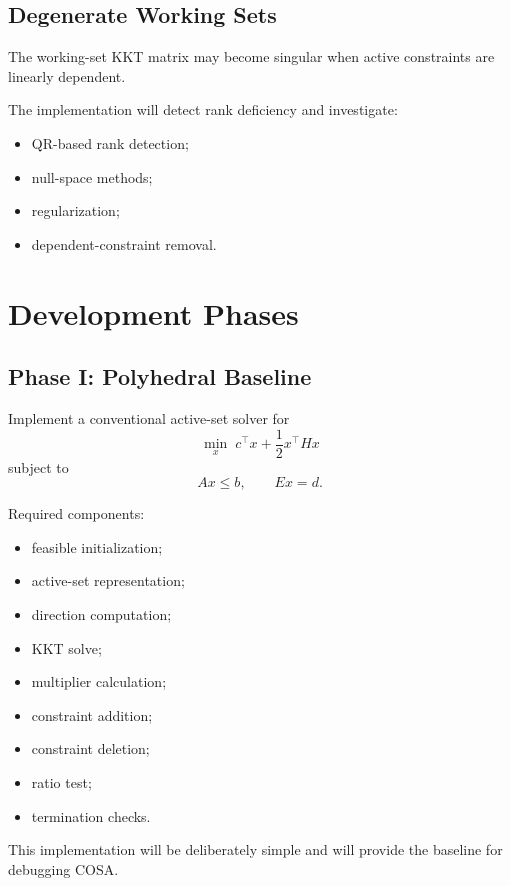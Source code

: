 \documentclass[11pt,a4paper]{article}
\begin{document}
\subsection{Degenerate Working Sets}

The working-set KKT matrix may become singular when active constraints
are linearly dependent.

The implementation will detect rank deficiency and investigate:

\begin{itemize}
    \item QR-based rank detection;
    \item null-space methods;
    \item regularization;
    \item dependent-constraint removal.
\end{itemize}

\section{Development Phases}

\subsection{Phase I: Polyhedral Baseline}

Implement a conventional active-set solver for
\[
\min_x\;
c^\top x+\frac12x^\top Hx
\]
subject to
\[
Ax\leq b,
\qquad
Ex=d.
\]

Required components:

\begin{itemize}
    \item feasible initialization;
    \item active-set representation;
    \item direction computation;
    \item KKT solve;
    \item multiplier calculation;
    \item constraint addition;
    \item constraint deletion;
    \item ratio test;
    \item termination checks.
\end{itemize}

This implementation will be deliberately simple and will provide the
baseline for debugging COSA.
\end{document}
